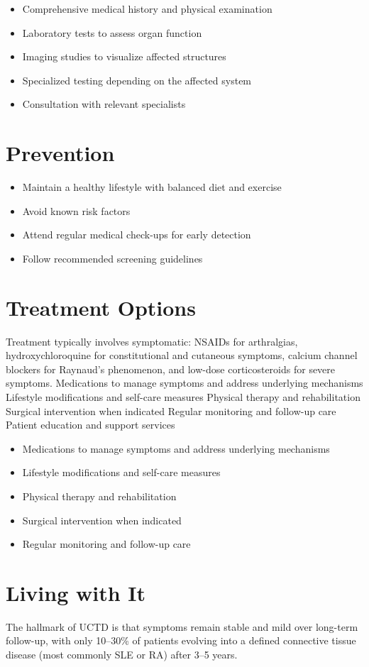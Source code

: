 \begin{itemize}[noitemsep]
  \item Comprehensive medical history and physical examination
  \item Laboratory tests to assess organ function
  \item Imaging studies to visualize affected structures
  \item Specialized testing depending on the affected system
  \item Consultation with relevant specialists
\end{itemize}
\section{Prevention}
\begin{itemize}[noitemsep]
  \item Maintain a healthy lifestyle with balanced diet and exercise
  \item Avoid known risk factors
  \item Attend regular medical check-ups for early detection
  \item Follow recommended screening guidelines
\end{itemize}
\section{Treatment Options}
Treatment typically involves symptomatic: NSAIDs for arthralgias, hydroxychloroquine for constitutional and cutaneous symptoms, calcium channel blockers for Raynaud's phenomenon, and low-dose corticosteroids for severe symptoms. Medications to manage symptoms and address underlying mechanisms Lifestyle modifications and self-care measures Physical therapy and rehabilitation Surgical intervention when indicated Regular monitoring and follow-up care Patient education and support services

\begin{itemize}[noitemsep]
  \item Medications to manage symptoms and address underlying mechanisms
  \item Lifestyle modifications and self-care measures
  \item Physical therapy and rehabilitation
  \item Surgical intervention when indicated
  \item Regular monitoring and follow-up care
\end{itemize}
\section{Living with It}
The hallmark of UCTD is that symptoms remain stable and mild over long-term follow-up, with only 10--30\% of patients evolving into a defined connective tissue disease (most commonly SLE or RA) after 3--5 years.

